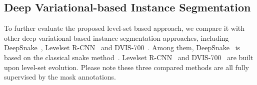\documentclass[12pt,onecolumn,letterpaper]{article}
\begin{document}
\begin{table}[t]
	\renewcommand\arraystretch{0.90}
	\centering
	\caption{The mask AP and inference speed of our method. Typical mask-supervised and box-supervised methods are listed here. The inference time is measured by using a single V100 GPU.}
	\label{tab:speed}
\end{table}


\subsection{Deep Variational-based Instance Segmentation}
To further evaluate the proposed level-set based approach, we compare it with other deep variational-based instance segmentation approaches, including DeepSnake~\cite{peng2020deepsnake}, 
Levelset R-CNN~\cite{eccv2020levelset} and DVIS-700~\cite{yuan2020deep}. Among them, 
DeepSnake~\cite{peng2020deepsnake} is based on the classical snake method~\cite{kass1988snakes}. 
Levelset R-CNN~\cite{eccv2020levelset} and DVIS-700~\cite{yuan2020deep} are built upon level-set evolution. Please note these three compared methods are all fully supervised by the mask annotations. 
\end{document}
